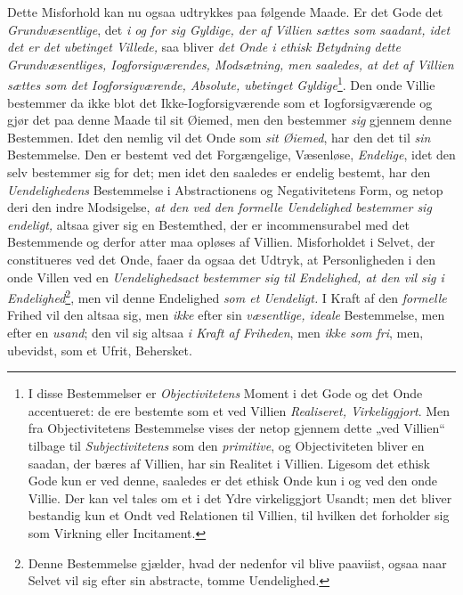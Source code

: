 Dette Misforhold kan nu ogsaa udtrykkes paa følgende Maade. Er det Gode det
\emph{Grundvæsentlige}, det \emph{i og for sig Gyldige, der af Villien sættes som
saadant, idet det er det ubetinget Villede,} saa bliver \emph{det Onde i ethisk
Betydning dette Grundvæsentliges, Iogforsigværendes, Modsætning, men saaledes, at
det af Villien sættes som det Iogforsigværende, Absolute, ubetinget
Gyldige}\footnote{I disse Bestemmelser er \emph{Objectivitetens} Moment i det
Gode og det Onde accentueret: de ere bestemte som et ved Villien
\emph{Realiseret, Virkeliggjort}. Men fra Objectivitetens Bestemmelse vises der
netop gjennem dette „ved Villien“ tilbage til \emph{Subjectivitetens} som den
\emph{primitive}, og Objectiviteten bliver en saadan, der bæres af Villien, har
sin Realitet i Villien. Ligesom det ethisk Gode kun er ved denne, saaledes er det
ethisk Onde kun i og ved den onde Villie. Der kan vel tales om et i det Ydre
virkeliggjort Usandt; men det bliver bestandig kun et Ondt ved Relationen til
Villien, til hvilken det forholder sig som Virkning eller Incitament.}. Den onde
Villie bestemmer da ikke blot det Ikke-Iogforsigværende som et Iogforsigværende
og gjør det paa denne Maade til sit Øiemed, men den bestemmer \emph{sig} gjennem
denne Bestemmen. Idet den nemlig vil det Onde som \emph{sit Øiemed}, har den det
til \emph{sin} Bestemmelse. Den er bestemt ved det Forgængelige, Væsenløse,
\emph{Endelige}, idet den selv bestemmer sig for det; men idet den saaledes er
endelig bestemt, har den \emph{Uendelighedens} Bestemmelse i Abstractionens og
Negativitetens Form, og netop deri den indre Modsigelse, \emph{at den ved den
formelle Uendelighed bestemmer sig endeligt,} altsaa giver sig en Bestemthed, der
er incommensurabel med det Bestemmende og derfor atter maa opløses af Villien.
 \setcounter{footnote}{0}%
Misforholdet i Selvet, der constitueres ved det Onde, faaer da ogsaa det Udtryk,
at Personligheden i den onde Villen ved en \emph{Uendelighedsact bestemmer sig
til Endelighed, at den vil sig i Endelighed}\footnote{Denne Bestemmelse gjælder,
hvad der nedenfor vil blive paaviist, ogsaa naar Selvet vil sig efter sin
abstracte, tomme Uendelighed.}, men vil denne Endelighed \emph{som et
Uendeligt.} I Kraft af den \emph{formelle} Frihed vil den altsaa sig, men
\emph{ikke} efter sin \emph{væsentlige, ideale} Bestemmelse, men efter en
\emph{usand}; den vil sig altsaa \emph{i Kraft af Friheden}, men \emph{ikke som
fri}, men, ubevidst, som et Ufrit, Behersket.

